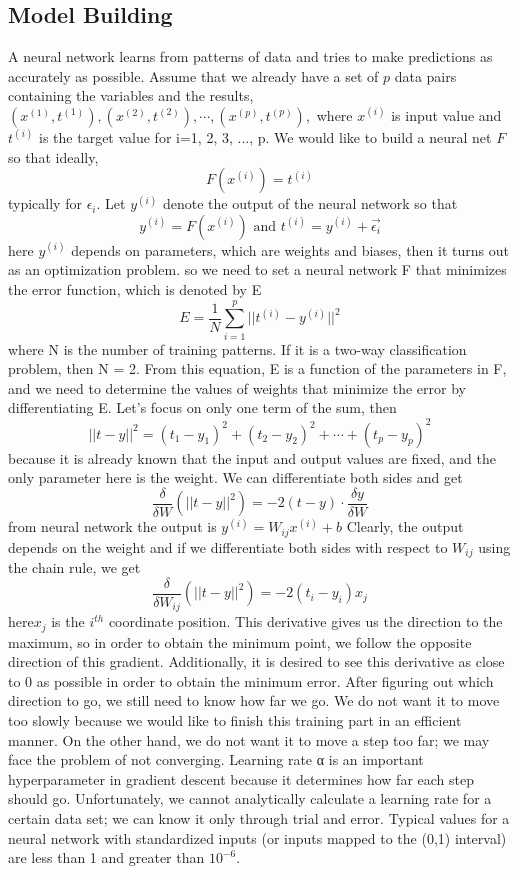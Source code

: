 \subsection{Model Building}
A neural network learns from patterns of data and tries to make predictions as accurately as possible. Assume that we already have a set of $p$ data pairs containing the variables and the results, $(x^{(1)},t^{(1)}),(x^{(2)},t^{(2)}),\cdots, (x^{(p)},t^{(p)}),$ where $x^{(i)}$ is input value and $t^{(i)}$ is the target value for i=1, 2, 3, ..., p. We would like to build a neural net $F$ so that ideally, $$F(x^{(i)}) = t^{(i)}$$
typically for $\epsilon_{i}$. Let $y^{(i)}$ denote the output of the  neural network so that 
$$y^{(i)} =F(x^{(i)})  \text{ and } t^{(i)} = y^{(i)} + \Vec{\epsilon_{i}}$$
here $y^{(i)}$ depends on parameters, which are weights and biases, then it turns out as an optimization problem. so we need to set a neural network F that minimizes the error function, which is denoted by E
$$ E = \frac{1}{N} \sum_{i=1}^{p}||t^{(i)}-y^{(i)}||^{2}$$
where N is the number of training patterns. If it is a two-way classification problem, then N = 2. From this equation, E is a function of the parameters in F, and we need to determine the values of weights that minimize the error by differentiating E. Let's focus on only one term of the sum, then
$$||t-y||^{2} = (t_{1}-y_{1})^{2}+(t_{2}-y_{2})^{2}+\cdots+(t_{p}-y_{p})^{2}$$
because it is already known that the input and output values are fixed, and the only parameter here is the weight. We can differentiate both sides and get
$$\frac{\delta}{\delta W}(||t-y||^{2}) = -2(t-y)\cdot\frac{\delta y}{\delta W}$$
from neural network the output is $y^{(i)} = W_{ij}x^{(i)}+b$ 
Clearly, the output depends on the weight and if we differentiate both sides with respect to $W_{ij}$ using the chain rule, we get$$\frac{\delta}{\delta W_{ij}}(||t-y||^{2}) = -2(t_{i}-y_{i})x_{j}$$
here$x_{j}$ is the $i^{th}$ coordinate position.
This derivative gives us the direction to the maximum, so in order to obtain the minimum point, we follow the opposite direction of this gradient. Additionally, it is desired to see this derivative as close to 0 as possible in order to obtain the minimum error. 
After figuring out which direction to go, we still need to know how far we go. We do not want it to move too slowly because we would like to finish this training part in an efficient manner. On the other hand, we do not want it to move a step too far; we may face the problem of not converging. Learning rate α is an important hyperparameter in
gradient descent because it determines how far each step should go. Unfortunately, we cannot analytically calculate a learning rate for a certain data set; we can know it only through trial and error. Typical values for a neural network with standardized inputs (or inputs mapped to the (0,1) interval) are less than 1 and greater than $10^{-6}$.

